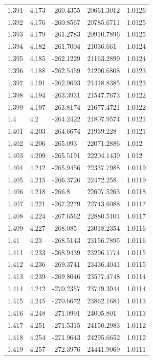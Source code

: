 \begin{tabular}{lllll}
1.391 & 4.173 & -260.4355 & 20661.3012 & 1.0126 \\
1.392 & 4.176 & -260.8567 & 20785.6711 & 1.0125 \\
1.393 & 4.179 & -261.2783 & 20910.7896 & 1.0125 \\
1.394 & 4.182 & -261.7004 & 21036.661 & 1.0124 \\
1.395 & 4.185 & -262.1229 & 21163.2899 & 1.0124 \\
1.396 & 4.188 & -262.5459 & 21290.6808 & 1.0123 \\
1.397 & 4.191 & -262.9693 & 21418.8385 & 1.0123 \\
1.398 & 4.194 & -263.3931 & 21547.7673 & 1.0122 \\
1.399 & 4.197 & -263.8174 & 21677.4721 & 1.0122 \\
1.4 & 4.2 & -264.2422 & 21807.9574 & 1.0121 \\
1.401 & 4.203 & -264.6674 & 21939.228 & 1.0121 \\
1.402 & 4.206 & -265.093 & 22071.2886 & 1.012 \\
1.403 & 4.209 & -265.5191 & 22204.1439 & 1.012 \\
1.404 & 4.212 & -265.9456 & 22337.7988 & 1.0119 \\
1.405 & 4.215 & -266.3726 & 22472.258 & 1.0119 \\
1.406 & 4.218 & -266.8 & 22607.5263 & 1.0118 \\
1.407 & 4.221 & -267.2279 & 22743.6088 & 1.0117 \\
1.408 & 4.224 & -267.6562 & 22880.5101 & 1.0117 \\
1.409 & 4.227 & -268.085 & 23018.2354 & 1.0116 \\
1.41 & 4.23 & -268.5143 & 23156.7895 & 1.0116 \\
1.411 & 4.233 & -268.9439 & 23296.1774 & 1.0115 \\
1.412 & 4.236 & -269.3741 & 23436.4041 & 1.0115 \\
1.413 & 4.239 & -269.8046 & 23577.4748 & 1.0114 \\
1.414 & 4.242 & -270.2357 & 23719.3944 & 1.0114 \\
1.415 & 4.245 & -270.6672 & 23862.1681 & 1.0113 \\
1.416 & 4.248 & -271.0991 & 24005.801 & 1.0113 \\
1.417 & 4.251 & -271.5315 & 24150.2983 & 1.0112 \\
1.418 & 4.254 & -271.9643 & 24295.6652 & 1.0112 \\
1.419 & 4.257 & -272.3976 & 24441.9069 & 1.0111 \\

\end{tabular}
